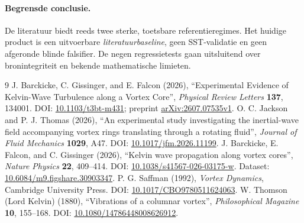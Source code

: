\documentclass[10pt,a4paper]{article}
\begin{document}
\paragraph{Begrensde conclusie.} De literatuur biedt reeds twee sterke, toetsbare referentieregimes. Het huidige product is een uitvoerbare \emph{literatuurbaseline}, geen SST-validatie en geen afgeronde blinde falsifier. De negen regressietests gaan uitsluitend over bronintegriteit en bekende mathematische limieten.

\begin{thebibliography}{9}
 J. Barckicke, C. Gissinger, and E. Falcon (2026), ``Experimental Evidence of Kelvin-Wave Turbulence along a Vortex Core'', \emph{Physical Review Letters} \textbf{137}, 134001. DOI: \href{https://doi.org/10.1103/t3bt-m431}{10.1103/t3bt-m431}; preprint \href{https://arxiv.org/abs/2607.07535}{arXiv:2607.07535v1}.
 O. C. Jackson and P. J. Thomas (2026), ``An experimental study investigating the inertial-wave field accompanying vortex rings translating through a rotating fluid'', \emph{Journal of Fluid Mechanics} \textbf{1029}, A47. DOI: \href{https://doi.org/10.1017/jfm.2026.11199}{10.1017/jfm.2026.11199}.
 J. Barckicke, E. Falcon, and C. Gissinger (2026), ``Kelvin wave propagation along vortex cores'', \emph{Nature Physics} \textbf{22}, 409--414. DOI: \href{https://doi.org/10.1038/s41567-026-03175-w}{10.1038/s41567-026-03175-w}. Dataset: \href{https://doi.org/10.6084/m9.figshare.30903347}{10.6084/m9.figshare.30903347}.
 P. G. Saffman (1992), \emph{Vortex Dynamics}, Cambridge University Press. DOI: \href{https://doi.org/10.1017/CBO9780511624063}{10.1017/CBO9780511624063}.
 W. Thomson (Lord Kelvin) (1880), ``Vibrations of a columnar vortex'', \emph{Philosophical Magazine} \textbf{10}, 155--168. DOI: \href{https://doi.org/10.1080/14786448008626912}{10.1080/14786448008626912}.
\end{thebibliography}
\end{document}
